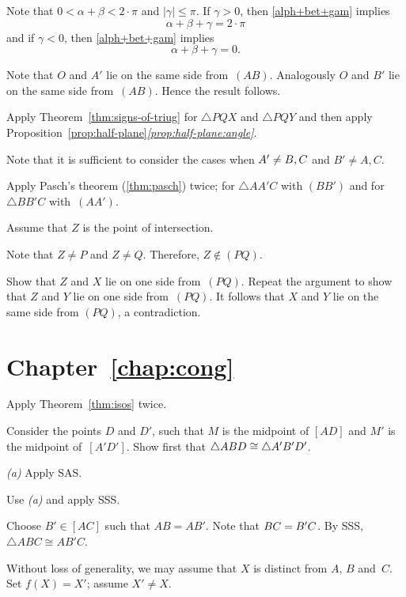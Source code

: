 Note that $0<\alpha+\beta<2\cdot\pi$ and $|\gamma|\le \pi$.
If $\gamma> 0$, then \ref{alph+bet+gam} implies
$$\alpha+\beta+\gamma=2\cdot\pi$$
and 
if $\gamma<0$, then \ref{alph+bet+gam} implies
$$\alpha+\beta+\gamma=0.$$


Note that $O$ and $A'$
lie on the same side from~$(AB)$.
Analogously $O$ and $B'$
lie on the same side from~$(AB)$.
Hence the result follows.


Apply Theorem~\ref{thm:signs-of-triug} for $\triangle PQX$ and $\triangle PQY$ and then 
apply Proposition~\ref{prop:half-plane}\textit{\ref{prop:half-plane:angle}}.

Note that it is sufficient to consider the cases when $A'\z\ne B,C$ and $B'\ne A, C$.

Apply Pasch's theorem (\ref{thm:pasch}) twice;
for $\triangle AA'C$ with  $(BB')$
and for $\triangle BB'C$ with~$(AA')$.

Assume that $Z$ is the point of intersection.

Note that $Z\ne P$ and $Z\ne Q$.
Therefore, $Z\notin (PQ)$.

Show that $Z$ and $X$ lie on one side from~$(PQ)$.
Repeat the argument to show that $Z$ and $Y$ lie on one side from~$(PQ)$.
It follows that $X$ and $Y$ lie on the same side from $(PQ)$, a contradiction.


\section*{Chapter~\ref{chap:cong}}
\setcounter{eqtn}{0}

Apply Theorem~\ref{thm:isos} twice.

Consider the points $D$ and $D'$, such that 
$M$ is the midpoint of $[AD]$
and 
$M'$ is the midpoint of~$[A'D']$.
Show first that $\triangle ABD\z\cong \triangle A'B'D'$.

 \textit{(a)} Apply SAS.

 Use \textit{(a)} and apply SSS.

Choose $B'\in [AC]$ such that $AB=AB'$.
Note that $BC\z=B'C$.
By SSS, 
 $\triangle ABC\cong AB'C$.

Without loss of generality, we may assume that $X$ is distinct from $A$, $B$ and~$C$.
Set $f(X)=X'$; assume $X'\ne X$.

